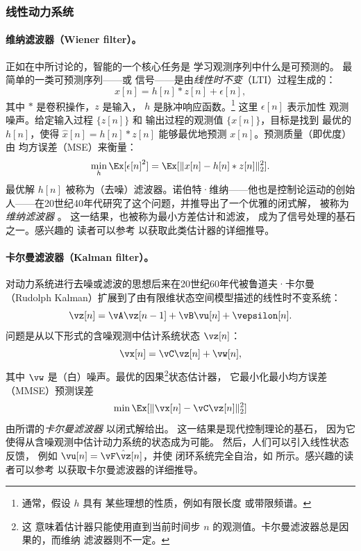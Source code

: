 \documentclass[../../book-main_zh.tex]{subfiles}
\begin{document}
\subsubsection{线性动力系统} \label{sec:linear-systems}

\vspace{2mm}
\paragraph{维纳滤波器（Wiener filter）。}
正如在中所讨论的，智能的一个核心任务是
学习观测序列中什么是可预测的。
最简单的一类可预测序列——或
信号——是由\textit{线性时不变}（LTI）过程生成的：
\begin{equation}
    x[n] = h[n]*z[n] + \epsilon[n],
    \label{eqn:Wiener-model}
\end{equation}
其中 \(*\) 是卷积操作，\(z\) 是输入，
\(h\) 是脉冲响应函数。\footnote{通常，假设 \(h\) 具有
    某些理想的性质，例如有限长度
或带限频谱。} 这里 \(\epsilon[n]\) 表示加性
观测噪声。给定输入过程 \(\{z[n]\}\) 和
输出过程的观测值 \(\{x[n]\}\)，目标是找到
最优的 \(h[n]\)，使得 \(\hat{x}[n] = h[n]*z[n]\) 能够最优地预测
\(x[n]\)。预测质量（即优度）由
均方误差（MSE）来衡量：
\begin{equation}
    \min_{h} \Ex[\epsilon[n]^{2}] = \Ex[\|x[n] - h[n]*z[n]\|_{2}^{2}].
    \label{eqn:wiener-mse}
\end{equation}
最优解 \(h[n]\) 被称为（去噪）滤波器。诺伯特·维纳——他也是控制论运动的创始人——在20世纪40年代研究了这个问题，并推导出了一个优雅的闭式解，
被称为\textit{维纳滤波器} \cite{Wiener-1942,Wiener-1949}。
这一结果，也被称为最小方差估计和滤波，
成为了信号处理的基石之一。感兴趣的
读者可以参考 \cite[附录 B]{MaY2003} 以获取此类估计器的详细推导。

\paragraph{卡尔曼滤波器（Kalman filter）。}
对动力系统进行去噪或滤波的思想后来在20世纪60年代被鲁道夫·卡尔曼（Rudolph Kalman）扩展到了由有限维状态空间模型描述的线性时不变系统：
\begin{equation}
    \vz[n] = \vA \vz[n-1] + \vB\vu[n] + \vepsilon[n].
    \label{eqn:linear-state-space}
\end{equation}
问题是从以下形式的含噪观测中估计系统状态 \(\vz[n]\)：
\begin{equation}
    \vx[n] = \vC \vz[n] + \vw[n],
    \label{eqn:Kalman-model}
\end{equation}
其中 \(\vw\) 是（白）噪声。最优的因果\footnote{这
    意味着估计器只能使用直到当前时间步 \(n\) 的观测值。卡尔曼滤波器总是因果的，而维纳
滤波器则不一定。}状态估计器，
它最小化最小均方误差
（MMSE）预测误差
\begin{equation}
    \min \Ex[ \|\vx[n] - \vC\vz[n]\|_{2}^{2}]
    \label{eqn:kalman-mse}
\end{equation}
由所谓的\textit{卡尔曼滤波器} \cite{kalman1960new} 以闭式解给出。
这一结果是现代控制理论的基石，
因为它使得从含噪观测中估计动力系统的状态成为可能。
然后，人们可以引入线性状态反馈，
例如 \(\vu[n] = \vF \hat{\vz}[n]\)，并使
闭环系统完全自治，如
 所示。感兴趣的读者可以参考
\cite[附录 B]{MaY2003} 以获取卡尔曼滤波器的详细推导。
\end{document}

